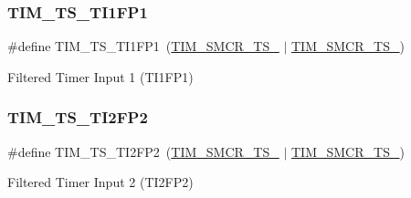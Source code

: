 \subsubsection{\texorpdfstring{TIM\_TS\_TI1FP1}{TIM\_TS\_TI1FP1}}
{\footnotesize\ttfamily \#define T\+I\+M\+\_\+\+T\+S\+\_\+\+T\+I1\+F\+P1~(\mbox{\hyperlink{group___peripheral___registers___bits___definition_ga8d1f040f9259acb3c2fba7b0c7eb3d96}{T\+I\+M\+\_\+\+S\+M\+C\+R\+\_\+\+T\+S\+\_}} $\vert$ \mbox{\hyperlink{group___peripheral___registers___bits___definition_gacf0dbaf4a2ec8759f283f82a958ef6a8}{T\+I\+M\+\_\+\+S\+M\+C\+R\+\_\+\+T\+S\+\_}})}

Filtered Timer Input 1 (T\+I1\+F\+P1) \mbox{\label{group___t_i_m___trigger___selection_ga0ed58a269bccd3f22d19cc9a2ba3123f}} 
\subsubsection{\texorpdfstring{TIM\_TS\_TI2FP2}{TIM\_TS\_TI2FP2}}
{\footnotesize\ttfamily \#define T\+I\+M\+\_\+\+T\+S\+\_\+\+T\+I2\+F\+P2~(\mbox{\hyperlink{group___peripheral___registers___bits___definition_gacb82212fcc89166a43ff97542da9182d}{T\+I\+M\+\_\+\+S\+M\+C\+R\+\_\+\+T\+S\+\_}} $\vert$ \mbox{\hyperlink{group___peripheral___registers___bits___definition_gacf0dbaf4a2ec8759f283f82a958ef6a8}{T\+I\+M\+\_\+\+S\+M\+C\+R\+\_\+\+T\+S\+\_}})}

Filtered Timer Input 2 (T\+I2\+F\+P2) 
